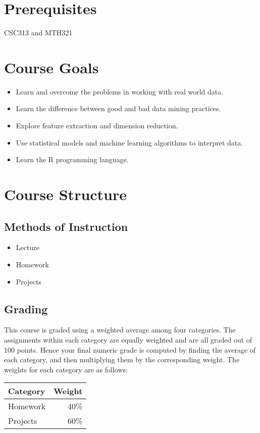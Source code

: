 \documentclass[11pt]{article}
\begin{document}
\section*{Prerequisites}
CSC313 and MTH321 


\section*{Course Goals}
\begin{itemize}
\item Learn and overcome the problems in working with real world data.
\item Learn the difference between good and bad data mining practices.
\item Explore feature extraction and dimension reduction.
\item Use statistical models and machine learning algorithms to interpret data.
\item Learn the R programming language.
\end{itemize}

\section*{Course Structure}
\subsection*{Methods of Instruction}
\begin{itemize}
    \item Lecture
    \item Homework
    \item Projects
\end{itemize}

\subsection*{Grading}
This course is graded using a weighted average among four categories.
The assignments within each category are equally weighted and are all
graded out of 100 points.  Hence your final numeric grade is
computed by finding the average of each category, and then multiplying
them by the corresponding weight.  The weights for each category are
as follows:

\begin{tabular}{|l|r|}
\hline
{\bf Category} & {\bf Weight}\\
\hline
Homework & 40\%\\
\hline
Projects & 60\%\\
\hline
\end{tabular}
\end{document}
